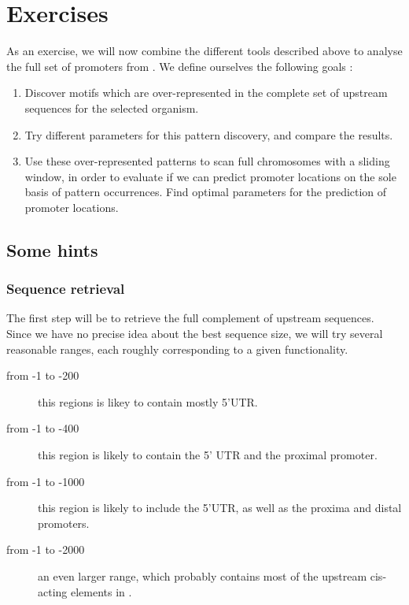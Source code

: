 
\section{Exercises}

As an exercise, we will now combine the different tools described
above to analyse the full set of promoters from . We define ourselves the following goals :
\begin{enumerate}
\item Discover motifs which are over-represented in the complete set
of upstream sequences for the selected organism. 
\item Try different parameters for this pattern discovery, and compare
the results.
\item Use these over-represented patterns to scan full chromosomes
with a sliding window, in order to evaluate if we can predict promoter
locations on the sole basis of pattern occurrences. Find optimal
parameters for the prediction of promoter locations.
\end{enumerate}

\subsection{Some hints}

\subsubsection{Sequence retrieval}

The first step will be to retrieve the full complement of upstream
sequences. Since we have no precise idea about the best sequence size,
we will try several reasonable ranges, each roughly corresponding to a
given functionality.

\begin{description}
\item[from -1 to -200] this regions is likey to contain mostly 5'UTR.
\item[from -1 to -400] this region is likely to contain the 5' UTR and
the proximal promoter.
\item[from -1 to -1000] this region is likely to include the 5'UTR,
as well as the proxima and distal promoters. 
\item[from -1 to -2000] an even larger range, which probably contains
most of the upstream cis-acting elements in .
\end{description}

